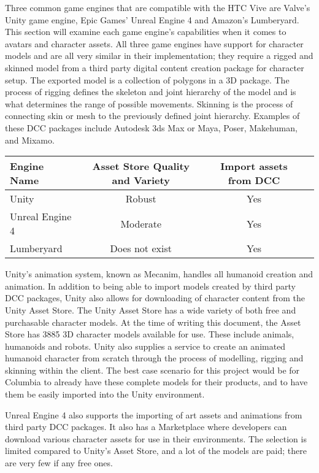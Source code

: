\documentclass[10pt,journal,compsoc,onecolumn, draftclsnofoot]{IEEEtran}
\begin{document}
\begin{bibunit}
Three common game engines that are compatible with the HTC Vive are Valve's Unity game engine, Epic Games' Unreal Engine 4 and Amazon's Lumberyard. This section will examine each game engine's capabilities when it comes to avatars and character assets. All three game engines have support for character models and are all very similar in their implementation; they require a rigged and skinned model from a third party digital content creation package for character setup. The exported model is a collection of polygons in a 3D package. The process of rigging defines the skeleton and joint hierarchy of the model and is what determines the range of possible movements. Skinning is the process of connecting skin or mesh to the previously defined joint hierarchy\cite{unity_character}. Examples of these DCC packages include Autodesk 3ds Max or Maya, Poser, Makehuman, and Mixamo.

\vspace{2mm}
\begin{table}[h!]
\centering
  \begin{tabular}{ | l || c | c | c | }
  \hline
  Engine Name & Asset Store Quality and Variety & Import assets from DCC\\
  \hline
  Unity & Robust & Yes\\ \hline
  Unreal Engine 4 & Moderate &  Yes\\ \hline
  Lumberyard & Does not exist & Yes\\ \hline
  \end{tabular}
\end{table}
\vspace{2mm}

Unity's animation system, known as Mecanim, handles all humanoid creation and animation. In addition to being able to import models created by third party DCC packages, Unity also allows for downloading of character content from the Unity Asset Store. The Unity Asset Store has a wide variety of both free and purchasable character models. At the time of writing this document, the Asset Store has 3885 3D character models available for use. These include animals, humanoids and robots. Unity also supplies a service to create an animated humanoid character from scratch through the process of modelling, rigging and skinning within the client. The best case scenario for this project would be for Columbia to already have these complete models for their products, and to have them be easily imported into the Unity environment.

Unreal Engine 4 also supports the importing of art assets and animations from third party DCC packages\cite{unreal_character}. It also has a Marketplace where developers can download various character assets for use in their environments. The selection is limited compared to Unity's Asset Store, and a lot of the models are paid; there are very few if any free ones.


\end{bibunit}
\end{document}
